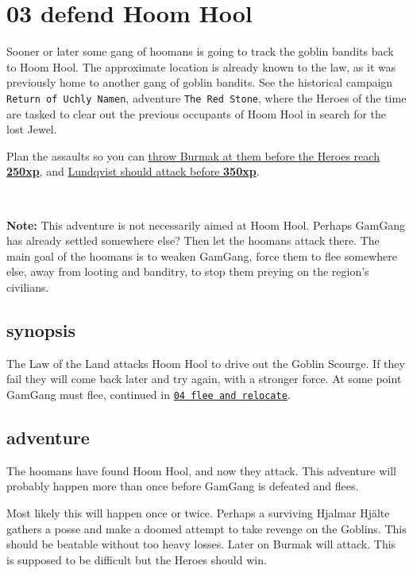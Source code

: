 \section*{03 defend Hoom Hool}
\label{03defendhoomhool}

Sooner or later some gang of hoomans is going to track the goblin bandits back to Hoom Hool. The approximate location is already known to the law, as it was previously home to another gang of goblin bandits. See the historical campaign \texttt{Return of Uchly Namen}, adventure \texttt{The Red Stone}, where the Heroes of the time are tasked to clear out the previous occupants of Hoom Hool in search for the lost Jewel.

Plan the assaults so you can 
\hyperref[appendixburmak]{throw Burmak at them before the Heroes reach \textbf{250xp}}, and 
\hyperref[appendixlundqvist]{Lundqvist should attack before \textbf{350xp}}.

\

\noindent\textbf{Note:} This adventure is not necessarily aimed at Hoom Hool. Perhaps GamGang has already settled somewhere else? Then let the hoomans attack there. The main goal of the hoomans is to weaken GamGang, force them to flee somewhere else, away from looting and banditry, to stop them preying on the region's civilians.


\subsection*{synopsis}

The Law of the Land attacks Hoom Hool to drive out the Goblin Scourge. If they fail they will come back later and try again, with a stronger force. At some point GamGang must flee, continued in \hyperref[04fleeandrelocate]{\texttt{04 flee and relocate}}.


\subsection*{adventure}

The hoomans have found Hoom Hool, and now they attack. This adventure will probably happen more than once before GamGang is defeated and flees.

Most likely this will happen once or twice. Perhaps a surviving Hjalmar Hjälte gathers a posse and make a doomed attempt to take revenge on the Goblins. This should be beatable without too heavy losses.
Later on Burmak will attack. This is supposed to be difficult but the Heroes should win.


